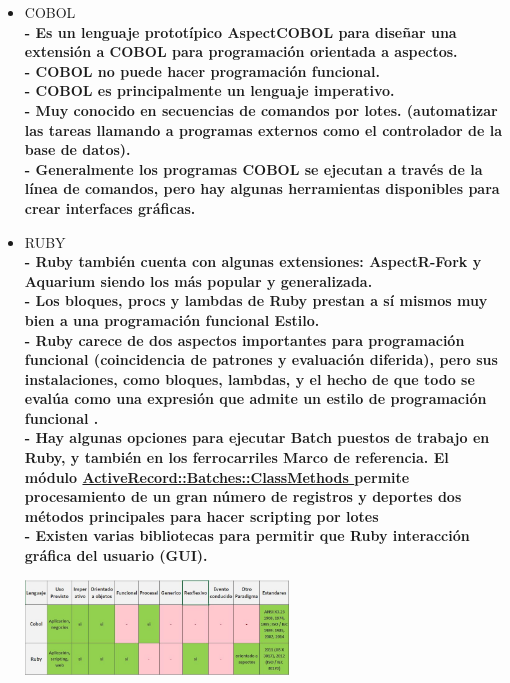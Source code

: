 \documentclass[twoside,twocolumn]{article}
\begin{document}
\begin{itemize}
\item COBOL
\\ \textbf{- Es un lenguaje prototípico AspectCOBOL para diseñar una extensión a COBOL para programación orientada a aspectos.}
\\ \textbf{- COBOL no puede hacer programación funcional.}
\\ \textbf{- COBOL es principalmente un lenguaje imperativo. }
\\ \textbf{- Muy conocido en secuencias de comandos por lotes.  (automatizar las tareas llamando a programas externos
como el controlador de la base de datos).}
\\ \textbf{- Generalmente los programas COBOL se ejecutan a través de la línea de comandos, pero hay algunas herramientas
disponibles para crear interfaces gráficas.}
\item RUBY
\\ \textbf{- Ruby también cuenta con algunas extensiones:
AspectR-Fork y Aquarium siendo los más
popular y generalizada.}
\\ \textbf{- Los bloques, procs y lambdas de Ruby prestan
a sí mismos muy bien a una programación funcional
Estilo.}
\\ \textbf{ - Ruby carece de dos aspectos importantes para
programación funcional (coincidencia de patrones y
evaluación diferida), pero sus instalaciones, como
bloques, lambdas, y el hecho de que todo
se evalúa como una expresión que admite un
estilo de programación funcional
.}
\\ \textbf{-  Hay algunas opciones para ejecutar Batch
puestos de trabajo en Ruby, y también en los ferrocarriles
Marco de referencia. El módulo
{\bf \underline {{} ActiveRecord::Batches::ClassMethods }}
permite procesamiento de un gran número de registros y deportes
dos métodos principales para hacer scripting por lotes}
\\ \textbf{- Existen varias bibliotecas para permitir que Ruby
interacción gráfica del usuario (GUI).
}
\begin{center}
	\includegraphics[width=7cm]{./Imagenes/Diferencias} 
	\end{center}
\end{itemize}
\end{document}
